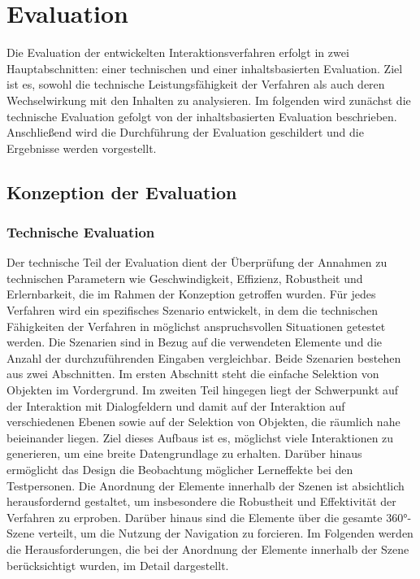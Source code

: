 \chapter{Evaluation}

Die Evaluation der entwickelten Interaktionsverfahren erfolgt in zwei Hauptabschnitten: einer technischen und einer inhaltsbasierten Evaluation. Ziel ist es, sowohl die technische Leistungsfähigkeit der Verfahren als auch deren Wechselwirkung mit den Inhalten zu analysieren. Im folgenden wird zunächst die technische Evaluation gefolgt von der inhaltsbasierten Evaluation beschrieben. Anschließend wird die Durchführung der Evaluation geschildert und die Ergebnisse werden vorgestellt. 

\section{Konzeption der Evaluation}

\subsection{Technische Evaluation}

Der technische Teil der Evaluation dient der Überprüfung der Annahmen zu technischen Parametern wie Geschwindigkeit, Effizienz, Robustheit und Erlernbarkeit, die im Rahmen der Konzeption getroffen wurden. Für jedes Verfahren wird ein spezifisches Szenario entwickelt, in dem die technischen Fähigkeiten der Verfahren in möglichst anspruchsvollen Situationen getestet werden. Die Szenarien sind in Bezug auf die verwendeten Elemente und die Anzahl der durchzuführenden Eingaben vergleichbar. Beide Szenarien bestehen aus zwei Abschnitten. Im ersten Abschnitt steht die einfache Selektion von Objekten im Vordergrund. Im zweiten Teil hingegen liegt der Schwerpunkt auf der Interaktion mit Dialogfeldern und damit auf der Interaktion auf verschiedenen Ebenen sowie auf der Selektion von Objekten, die räumlich nahe beieinander liegen. Ziel dieses Aufbaus ist es, möglichst viele Interaktionen zu generieren, um eine breite Datengrundlage zu erhalten. Darüber hinaus ermöglicht das Design die Beobachtung möglicher Lerneffekte bei den Testpersonen. Die Anordnung der Elemente innerhalb der Szenen ist absichtlich herausfordernd gestaltet, um insbesondere die Robustheit und Effektivität der Verfahren zu erproben. Darüber hinaus sind die Elemente über die gesamte 360°-Szene verteilt, um die Nutzung der Navigation zu forcieren. Im Folgenden werden die Herausforderungen, die bei der Anordnung der Elemente innerhalb der Szene berücksichtigt wurden, im Detail dargestellt. 


